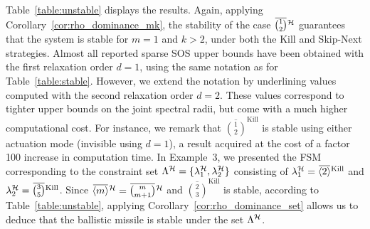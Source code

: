 Table~\ref{table:unstable} displays the results.
Again, applying Corollary~\ref{cor:rho_dominance_mk}, the stability of the case $\overbar{\binom{1}{2}}^{\strat}$ guarantees that the system is stable for $m=1$ and $k>2$, under both the Kill and Skip-Next strategies.
Almost all reported sparse SOS upper bounds have been obtained with the first relaxation order $d=1$, using the same notation as for Table~\ref{table:stable}.
However, we extend the notation by underlining values computed with the second relaxation order $d=2$.
These values correspond to tighter upper bounds on the joint spectral radii, but come with a much higher computational cost.
For instance, we remark that $\overbar{\binom{1}{2}}^{\text{Kill}}$ is stable using either actuation mode (invisible using $d=1$), a result acquired at the cost of a factor 100 increase in computation time.
%
In Example~$3$, we presented the FSM corresponding to the constraint set $\Lambda^{\mathcal{H}} = \{ \lambda^{\mathcal{H}}_1, \lambda^{\mathcal{H}}_2 \}$ consisting of $\lambda^{\strat}_1 = \overbar{\left<2\right>}^{\text{Kill}}$ and $\lambda^{\strat}_2 = \overbar{\binom{3}{5}}^{\text{Kill}}$.
Since $\overbar{\left<m\right>}^{\strat} = \overbar{\binom{m}{m+1}}^{\strat}$ and $\overbar{\binom{2}{3}}^{\text{Kill}}$ is stable, according to Table~\ref{table:unstable}, applying Corollary~\ref{cor:rho_dominance_set} allows us to deduce that the ballistic missile is stable under the \ewhc{} set $\Lambda^{\mathcal{H}}$.

%
